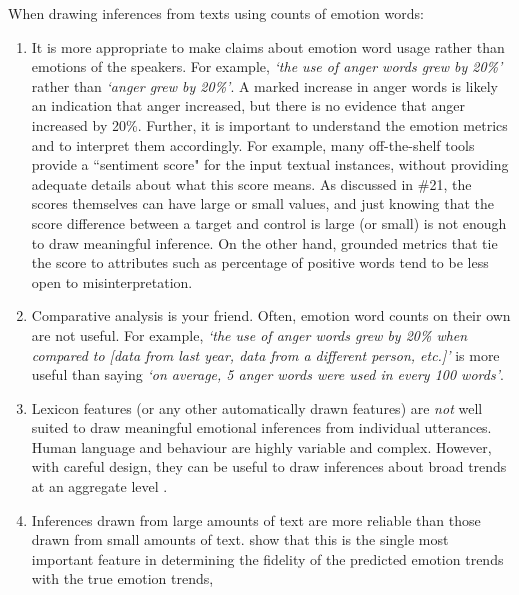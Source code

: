 \documentclass[11pt]{article}
\newcommand{\sm}[1]{{\color{black} #1}} %
\begin{document}
 When drawing inferences from texts using counts of emotion words:\\[-19pt]
\begin{enumerate}[label=\alph*.]
\item It is more appropriate to make claims about emotion word usage rather than emotions of the speakers. For example, {\it `the use of anger words grew by 20\%'} rather than {\it `anger grew by 20\%'}. 
A marked increase in anger words is likely an indication that anger increased, but there is no evidence that anger increased by 20\%.
\sm{Further, it is important to understand the emotion metrics and to interpret them accordingly.
For example, many off-the-shelf tools provide a ``sentiment score" for the input textual instances, without  providing
adequate details about what this score means. As discussed in \#21, the scores themselves can have large or small values, and just knowing that
the score difference between a target and control is large (or small) is not enough to draw meaningful inference. On the other hand,
grounded metrics that tie the score to attributes such as percentage of positive words tend to be less open to misinterpretation.}
\\[-22pt]
\item Comparative analysis is your friend. Often, emotion word counts on their own are not useful. 
For example, {\it `the use of anger words grew by 20\% when compared to [data from last year, data from a different person, etc.]'} is more useful than saying {\it `on average, 5 anger words were used in every 100 words'}.\\[-22pt]
\item Lexicon features (or any other automatically drawn features) are \textit{not} well suited to draw meaningful emotional inferences from individual utterances. Human language and behaviour are highly variable and complex. However, with careful design, they can be
useful to draw inferences about broad trends at an aggregate level \cite{TMemotionarcs}. \\[-22pt]
\item Inferences drawn from large amounts of text are more reliable than those drawn from small amounts of text.  show that this is the single most important feature in determining the fidelity of the predicted emotion trends with the true emotion trends,

\end{enumerate}
\end{document}
